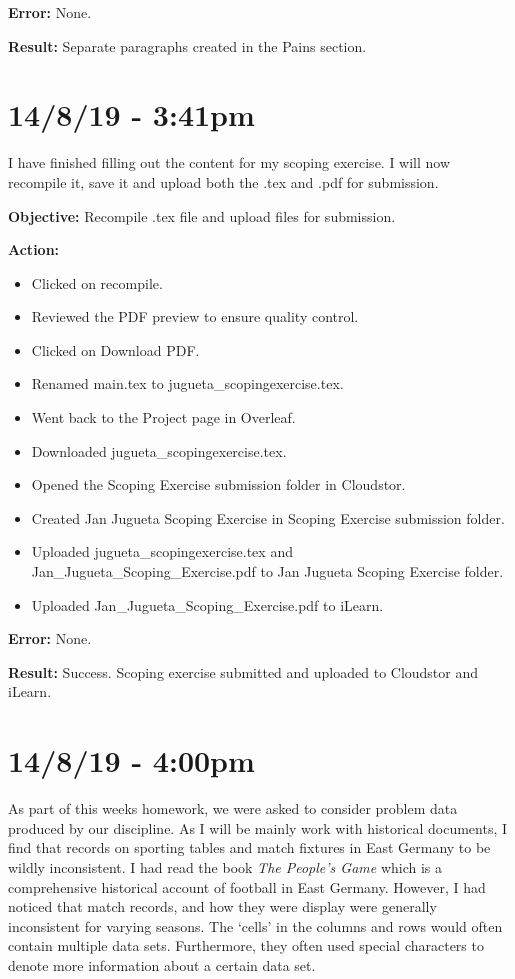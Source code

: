\documentclass{article}
\begin{document}
\textbf{Error:} None.

\textbf{Result:} Separate paragraphs created in the Pains section.

\section*{14/8/19 - 3:41pm}

I have finished filling out the content for my scoping exercise. I will now recompile it, save it and upload both the .tex and .pdf for submission.

\textbf{Objective:} Recompile .tex file and upload files for submission.

\textbf{Action:}
\begin{itemize}
    \item Clicked on recompile.
    \item Reviewed the PDF preview to ensure quality control.
    \item Clicked on Download PDF.
    \item Renamed main.tex to jugueta\_scopingexercise.tex.
    \item Went back to the Project page in Overleaf.
    \item Downloaded jugueta\_scopingexercise.tex.
    \item Opened the Scoping Exercise submission folder in Cloudstor.
    \item Created Jan Jugueta Scoping Exercise in Scoping Exercise submission folder.
    \item Uploaded jugueta\_scopingexercise.tex and Jan\_Jugueta\_Scoping\_Exercise.pdf to  Jan Jugueta Scoping Exercise folder.
    \item Uploaded Jan\_Jugueta\_Scoping\_Exercise.pdf to iLearn.
\end{itemize}

\textbf{Error:} None.

\textbf{Result:} Success. Scoping exercise submitted and uploaded to Cloudstor and iLearn.

\section*{14/8/19 - 4:00pm}

As part of this weeks homework, we were asked to consider problem data produced by our discipline. As I will be mainly work with historical documents, I find that records on sporting tables and match fixtures in East Germany to be wildly inconsistent. I had read the book \textit{The People’s Game}  which is a comprehensive historical account of football in East Germany. However, I had noticed that match records, and how they were display were generally inconsistent for varying seasons. The ‘cells’ in the columns and rows would often contain multiple data sets. Furthermore, they often used special characters to denote more information about a certain data set.
\end{document}
